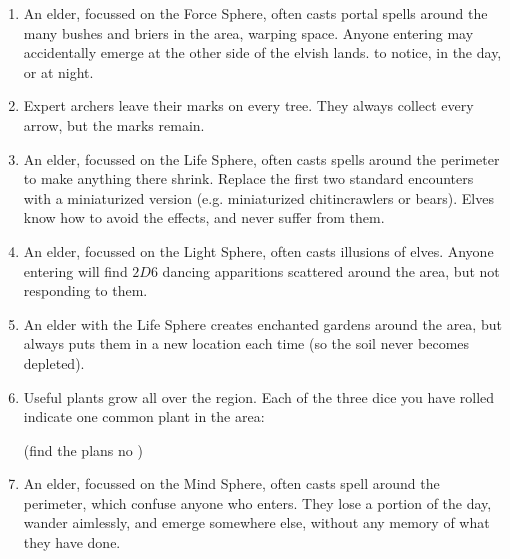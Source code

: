 \begin{multicols}{2}
\begin{enumerate}
  \item
  An elder, focussed on the Force Sphere, often casts portal spells around the many bushes and briers in the area, warping space.
  Anyone entering may accidentally emerge at the other side of the elvish lands.
   to notice, \tn[7] in the day, or \tn[12] at night.
  \item
  Expert archers leave their marks on every tree.
  They always collect every arrow, but the marks remain.
  \item
  An elder, focussed on the Life Sphere, often casts spells around the perimeter to make anything there shrink.
  Replace the first two standard encounters with a miniaturized version (e.g. miniaturized chitincrawlers or bears).
  Elves know how to avoid the effects, and never suffer from them.
  \item
  An elder, focussed on the Light Sphere, often casts illusions of elves.
  Anyone entering will find $2D6$ dancing apparitions scattered around the area, but not responding to them.
  \item
  An elder with the Life Sphere creates enchanted gardens around the area, but always puts them in a new location each time (so the soil never becomes depleted).
  \item
  Useful plants grow all over the region.
  Each of the three dice you have rolled indicate one common plant in the area:
  (find the plans no )
  \item
  An elder, focussed on the Mind Sphere, often casts spell around the perimeter, which confuse anyone who enters.
  They lose a portion of the day, wander aimlessly, and emerge somewhere else, without any memory of what they have done.


\end{enumerate}
\end{multicols}
